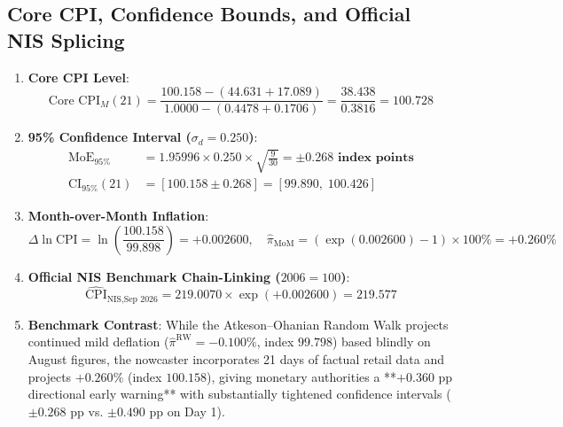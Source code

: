 \documentclass[a4paper, 11pt]{article}
\begin{document}
\subsection{Core CPI, Confidence Bounds, and Official NIS Splicing}
\begin{enumerate}
    \item \textbf{Core CPI Level}:
    \begin{equation}
        \text{Core CPI}_M(21) = \frac{100.158 - (44.631 + 17.089)}{1.0000 - (0.4478 + 0.1706)} = \frac{38.438}{0.3816} = \mathbf{100.728}
    \end{equation}
    \item \textbf{95\% Confidence Interval ($\sigma_d = 0.250$)}:
    \begin{align}
        \text{MoE}_{95\%} &= 1.95996 \times 0.250 \times \sqrt{\frac{9}{30}} = \mathbf{\pm 0.268 \text{ index points}} \\
        \text{CI}_{95\%}(21) &= [100.158 \pm 0.268] = \mathbf{[99.890, \; 100.426]}
    \end{align}
    \item \textbf{Month-over-Month Inflation}:
    \begin{equation}
        \Delta \ln \text{CPI} = \ln\left(\frac{100.158}{99.898}\right) = \mathbf{+0.002600}, \quad \widehat{\pi}_{\text{MoM}} = (\exp(0.002600) - 1) \times 100\% = \mathbf{+0.260\%}
    \end{equation}
    \item \textbf{Official NIS Benchmark Chain-Linking ($2006=100$)}:
    \begin{equation}
        \widehat{\text{CPI}}_{\text{NIS}, \text{Sep 2026}} = 219.0070 \times \exp(+0.002600) = \mathbf{219.577}
    \end{equation}
    \item \textbf{Benchmark Contrast}: While the Atkeson--Ohanian Random Walk projects continued mild deflation ($\widehat{\pi}^{\text{RW}} = -0.100\%$, index $99.798$) based blindly on August figures, the nowcaster incorporates 21 days of factual retail data and projects $\mathbf{+0.260\%}$ (index $100.158$), giving monetary authorities a **$+0.360$ pp directional early warning** with substantially tightened confidence intervals ($\pm 0.268$ pp vs. $\pm 0.490$ pp on Day 1).
\end{enumerate}

\end{document}
